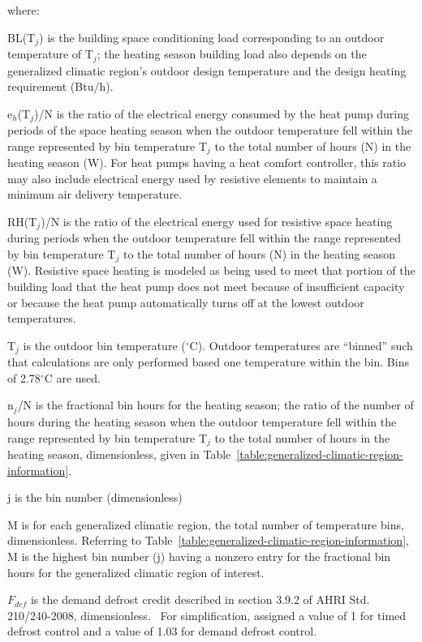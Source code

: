 where:

BL(T\(_{j}\)) is the building space conditioning load corresponding to an outdoor temperature of T\(_{j}\); the heating season building load also depends on the generalized climatic region's outdoor design temperature and the design heating requirement (Btu/h).

e\(_{h}\)(T\(_{j}\))/N is the ratio of the electrical energy consumed by the heat pump during periods of the space heating season when the outdoor temperature fell within the range represented by bin temperature T\(_{j}\) to the total number of hours (N) in the heating season (W). For heat pumps having a heat comfort controller, this ratio may also include electrical energy used by resistive elements to maintain a minimum air delivery temperature.

RH(T\(_{j}\))/N is the ratio of the electrical energy used for resistive space heating during periods when the outdoor temperature fell within the range represented by bin temperature T\(_{j}\) to the total number of hours (N) in the heating season (W). Resistive space heating is modeled as being used to meet that portion of the building load that the heat pump does not meet because of insufficient capacity or because the heat pump automatically turns off at the lowest outdoor temperatures.

T\(_{j}\) is the outdoor bin temperature (\(^{\circ}\)C). Outdoor temperatures are ``binned'' such that calculations are only performed based one temperature within the bin. Bins of 2.78\(^{\circ}\)C are used.

n\(_{j}\)/N is the fractional bin hours for the heating season; the ratio of the number of hours during the heating season when the outdoor temperature fell within the range represented by bin temperature T\(_{j}\) to the total number of hours in the heating season, dimensionless, given in Table~\ref{table:generalized-climatic-region-information}.

j is the bin number (dimensionless)

M is for each generalized climatic region, the total number of temperature bins, dimensionless. Referring to Table~\ref{table:generalized-climatic-region-information}, M is the highest bin number (j) having a nonzero entry for the fractional bin hours for the generalized climatic region of interest.

\({F_{def}}\) is the demand defrost credit described in section 3.9.2 of AHRI Std. 210/240-2008, dimensionless.~ For simplification, assigned a value of 1 for timed defrost control and a value of 1.03 for demand defrost control.


